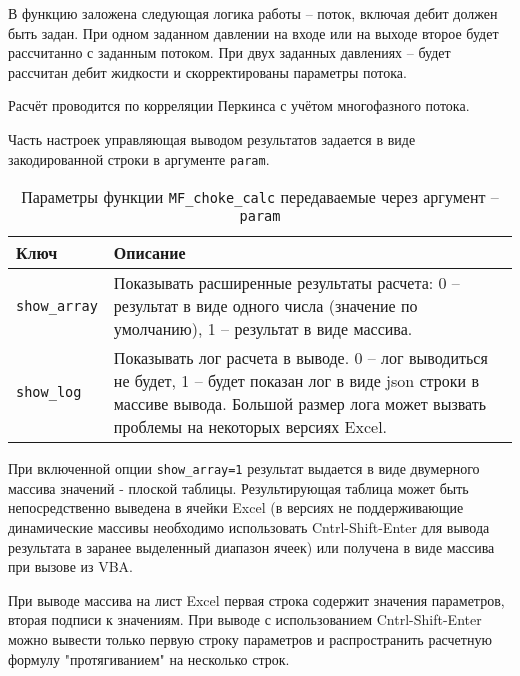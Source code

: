 В функцию заложена следующая логика работы -- поток, включая дебит должен быть задан. При одном заданном давлении на входе или на выходе второе будет рассчитанно с заданным потоком. При двух заданных давлениях -- будет рассчитан дебит жидкости и скорректированы параметры потока.

Расчёт проводится по корреляции Перкинса \cite{Perkins_1993} с учётом многофазного потока. 


Часть настроек управляющая выводом результатов задается в виде закодированной строки в аргументе \texttt{param}.

\begin{table}[H]
	\caption{Параметры функции \texttt{MF_choke_calc} передаваемые через аргумент -- \texttt{param}}
	\label{table:param_list_3}
	\begin{tabular}{p{}p{}}
		\hline
		Ключ & Описание  \\ \hline
		\texttt{show_array} & Показывать расширенные результаты расчета: 0 -- результат в виде одного числа (значение по умолчанию), 1 -- результат в виде массива.    \\ \hline
		
		\texttt{show_log} & Показывать лог расчета в выводе. 0 -- лог выводиться не будет, 1 -- будет показан лог в виде json строки в массиве вывода. Большой размер лога может вызвать проблемы на некоторых версиях Excel.   \\ \hline
		
		
	\end{tabular}
\end{table}
 
При включенной опции \texttt{show_array=1} результат выдается в виде двумерного массива значений - плоской таблицы. Результирующая таблица может быть непосредственно выведена в ячейки Excel (в версиях не поддерживающие динамические массивы необходимо использовать Cntrl-Shift-Enter для вывода результата в заранее выделенный диапазон ячеек) или получена в виде массива при вызове из VBA.
 
При выводе массива на лист Excel первая строка содержит значения параметров, вторая подписи к значениям. При выводе с использованием Cntrl-Shift-Enter можно вывести только первую строку параметров и распространить расчетную формулу "протягиванием" на несколько строк.
 

